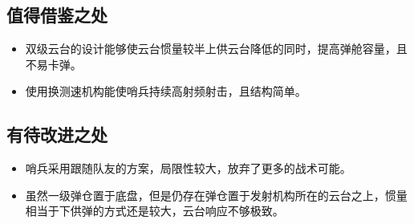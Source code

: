 \subsection{值得借鉴之处}
\begin{itemize}
      \item 双级云台的设计能够使云台惯量较半上供云台降低的同时，提高弹舱容量，且不易卡弹。
      \item 使用换测速机构能使哨兵持续高射频射击，且结构简单。
\end{itemize}

\subsection{有待改进之处}
\begin{itemize}
    \item 哨兵采用跟随队友的方案，局限性较大，放弃了更多的战术可能。
    \item 虽然一级弹仓置于底盘，但是仍存在弹仓置于发射机构所在的云台之上，惯量相当于下供弹的方式还是较大，云台响应不够极致。
\end{itemize}